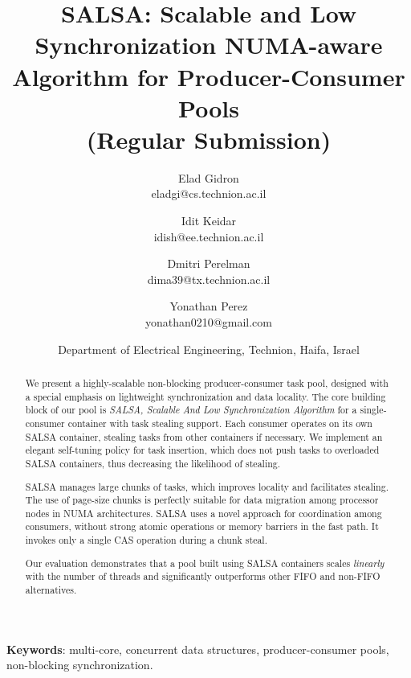 \documentclass[11pt]{article}
\theoremstyle{plain}
\begin{document}
\begin{titlepage}

\title{SALSA: Scalable and Low Synchronization NUMA-aware Algorithm for Producer-Consumer Pools \\
       {\Large (Regular Submission)}}

\author{Elad Gidron \\
   eladgi@cs.technion.ac.il \\
   \and
   Idit Keidar \\
   idish@ee.technion.ac.il \\
   \and
   Dmitri Perelman \\
   dima39@tx.technion.ac.il \\
   \and
   Yonathan Perez \\
   yonathan0210@gmail.com
   } 

\date{Department of Electrical Engineering, Technion, Haifa, Israel}

\maketitle \thispagestyle{empty}

\begin{abstract}
We present a highly-scalable non-blocking producer-consumer task pool, designed with a special emphasis on lightweight synchronization and data locality.
The core building block of our pool is \emph{SALSA, Scalable And Low Synchronization Algorithm} for a single-consumer container with task stealing support. Each consumer operates on its own SALSA container, stealing tasks from other containers if necessary. We implement an elegant self-tuning policy for task insertion, which does not push tasks to overloaded SALSA containers, thus decreasing the likelihood of stealing. 

SALSA manages large chunks of tasks, which improves locality and facilitates stealing. The use of page-size chunks is perfectly suitable for data migration among processor nodes in NUMA architectures. 
SALSA uses a novel approach for coordination among consumers, without strong atomic operations or memory barriers in the fast path. It invokes only a single CAS operation during a chunk steal. 

Our evaluation demonstrates that a pool built using SALSA containers scales \emph{linearly} with the number of threads and significantly outperforms other FIFO and non-FIFO alternatives.

\end{abstract}

\bigskip

\centerline{{\bf Keywords}: multi-core, concurrent data structures, producer-consumer pools, non-blocking synchronization.}

\end{titlepage}
\end{document}
